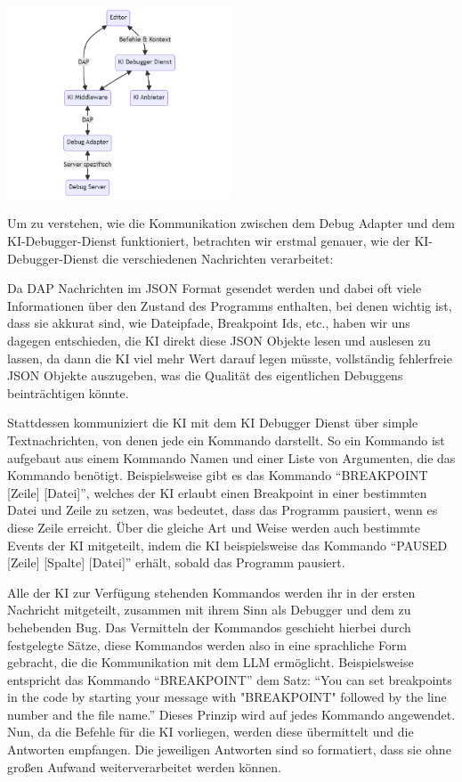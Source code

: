 \documentclass[a4paper,12pt,ngerman]{scrartcl}
\begin{document}
\begin{center}	
	\includegraphics[width=0.5\textwidth]{ai_integration}
\end{center}

Um zu verstehen, wie die Kommunikation zwischen dem Debug Adapter und dem KI-Debugger-Dienst funktioniert, betrachten wir erstmal genauer, wie der KI-Debugger-Dienst die verschiedenen Nachrichten verarbeitet:

Da DAP Nachrichten im JSON Format gesendet werden und dabei oft viele Informationen über den Zustand des Programms enthalten, bei denen wichtig ist, dass sie akkurat sind, wie Dateipfade, Breakpoint Ids, etc., haben wir uns dagegen entschieden, die KI direkt diese JSON Objekte lesen und auslesen zu lassen, da dann die KI viel mehr Wert darauf legen müsste, vollständig fehlerfreie JSON Objekte auszugeben, was die Qualität des eigentlichen Debuggens beinträchtigen könnte.

Stattdessen kommuniziert die KI mit dem KI Debugger Dienst über simple Textnachrichten, von denen jede ein Kommando darstellt. So ein Kommando ist aufgebaut aus einem Kommando Namen und einer Liste von Argumenten, die das Kommando benötigt. Beispielsweise gibt es das Kommando ``BREAKPOINT [Zeile] [Datei]'', welches der KI erlaubt einen Breakpoint in einer bestimmten Datei und Zeile zu setzen, was bedeutet, dass das Programm pausiert, wenn es diese Zeile erreicht. Über die gleiche Art und Weise werden auch bestimmte Events der KI mitgeteilt, indem die KI beispielsweise das Kommando ``PAUSED [Zeile] [Spalte] [Datei]'' erhält, sobald das Programm pausiert.

Alle der KI zur Verfügung stehenden Kommandos werden ihr in der ersten Nachricht mitgeteilt, zusammen mit ihrem Sinn als Debugger und dem zu behebenden Bug. Das Vermitteln der Kommandos geschieht hierbei durch festgelegte Sätze, diese Kommandos werden also in eine sprachliche Form gebracht, die die Kommunikation mit dem LLM ermöglicht. Beispielsweise entspricht das Kommando ``BREAKPOINT'' dem Satz: ``You can set breakpoints in the code by starting your message with "BREAKPOINT" followed by the line number and the file name.'' Dieses Prinzip wird auf jedes Kommando angewendet. Nun, da die Befehle für die KI vorliegen, werden diese übermittelt und die Antworten empfangen. Die jeweiligen Antworten sind so formatiert, dass sie ohne großen Aufwand weiterverarbeitet werden können.
\end{document}
